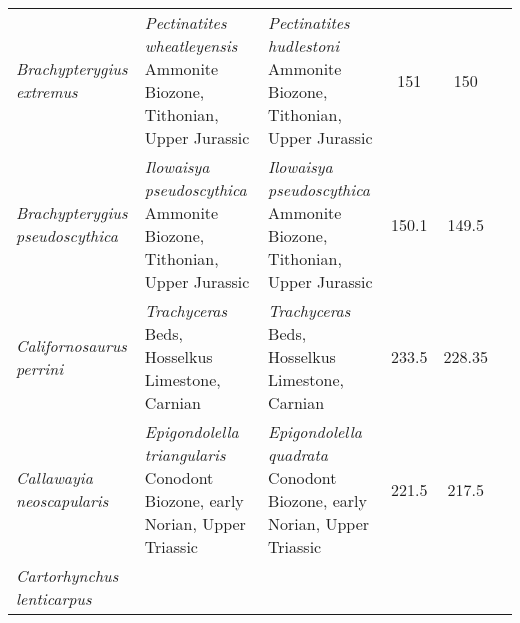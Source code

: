\begin{longtabu}{>{\itshape}lXXSSl}
	Brachypterygius extremus                             &
        \emph{Pectinatites wheatleyensis} Ammonite Biozone, Tithonian, Upper
        Jurassic                                                      &
        \emph{Pectinatites hudlestoni} Ammonite Biozone, Tithonian, Upper
        Jurassic                                                         & 151
                                                                         & 150
                                                                         &
                                                                         \cite{Moon2018MPS} \\                       
	Brachypterygius pseudoscythica                       & \emph{Ilowaisya
        pseudoscythica} Ammonite Biozone, Tithonian, Upper Jurassic
                                                             & \emph{Ilowaisya
        pseudoscythica} Ammonite Biozone, Tithonian, Upper Jurassic
                                                             & 150.1
                                                             & 149.5
                                                             &
                                                             \cite{Efimov1998PZ} \\                     
	Californosaurus perrini                              &
        \emph{Trachyceras} Beds, Hosselkus Limestone, Carnian
                                                             &
        \emph{Trachyceras} Beds, Hosselkus Limestone, Carnian
                                                             & 233.5
                                                             & 228.35
                                                             &
                                                             \cite{Merriam1902UCBDG,Merriam1908MUC} \\        
	Callawayia neoscapularis                             &
        \emph{Epigondolella triangularis} Conodont Biozone, early Norian, Upper
        Triassic                                                   &
        \emph{Epigondolella quadrata} Conodont Biozone, early Norian, Upper
        Triassic                                                       & 221.5
                                                                       & 217.5
                                                                       &
                                                                       \cite{McGowan1994JVPa} \\                   
	Cartorhynchus lenticarpus                            &

\end{longtabu}

